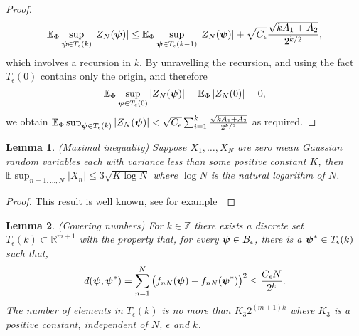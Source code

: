 \documentclass[aap,preprint]{imsart}
\newcommand{\reals}{{\mathbb R}}
\newcommand{\ints}{{\mathbb Z}}
\newcommand{\expect}{{\mathbb E}}
\newcommand{\abs}[1]{\left\vert #1 \right\vert}
\newcommand{\sabs}[1]{\vert #1 \vert}
\newtheorem{lemma}{Lemma}
\begin{document}
\begin{proof}
\begin{align*}
\expect_{\Phi} \sup_{\psibf \in T_\epsilon(k) } \sabs{ Z_N(\psibf) } \leq \expect_{\Phi} \sup_{\psibf \in T_\epsilon(k-1)} \sabs{ Z_N(\psibf) }  + \sqrt{C_\epsilon}\frac{\sqrt{  k A_1 + A_2 }}{2^{k/2}},
\end{align*}
which involves a recursion in $k$.  By unravelling the recursion, and using the fact $T_\epsilon(0)$ contains only the origin, and therefore 
\[
\expect_{\Phi}\sup_{\psibf \in T_\epsilon(0)} \abs{ Z_N(\psibf) } = \expect_{\Phi}\abs{ Z_N(0) } = 0,
\]
we obtain $\expect_{\Phi} \sup_{\psibf \in T_\epsilon(k) } \abs{ Z_N(\psibf) } < \sqrt{C_\epsilon} \sum_{i=1}^{k}\frac{\sqrt{  k A_1 + A_2 }}{2^{k/2}}$
as required.
\end{proof}

\begin{lemma}\label{lem:maxineq}(Maximal inequality)
Suppose $X_1, \dots, X_N$ are zero mean Gaussian random variables each with variance less than some positive constant $K$, then $\expect \sup_{n = 1, \dots, N} \abs{X_n} \leq 3  \sqrt{K \log N}$ where $\log N$ is the natural logarithm of $N$.
\end{lemma}
\begin{proof}
This result is well known, see for example~\cite[Section 3]{Pollard_asymp_empi_proc_1989}  
\end{proof}


\begin{lemma}\label{lem:metricentropy} (Covering numbers)
For $k \in \ints$ there exists a discrete set $T_\epsilon(k) \subset \reals^{m+1}$ with the property that, for every $\boldsymbol{\psi} \in B_\epsilon$, there is a $\boldsymbol{\psi}^* \in T_\epsilon(k)$ such that,
\[
d(\boldsymbol{\psi},\boldsymbol{\psi}^*) = \sum_{n = 1}^N \big( f_{nN}(\boldsymbol{\psi}) - f_{nN}(\boldsymbol{\psi}^*) \big)^2 \leq \frac{C_\epsilon N}{2^k}.
\]
The number of elements in $T_\epsilon(k)$ is no more than $K_3 2^{(m+1)k}$ where $K_3$ is a positive constant, independent of $N$, $\epsilon$ and $k$.
\end{lemma}
\end{document}
